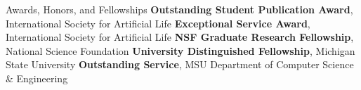 \begin{rubric}{Awards, Honors, and Fellowships}
\entry*[2019] \textbf{Outstanding Student Publication Award}, International Society for Artificial Life 
%
\entry*[2019] \textbf{Exceptional Service Award}, International Society for Artificial Life 
%
\entry*[2014 -- 2017] \textbf{NSF Graduate Research Fellowship}, National Science Foundation 
%
\entry*[2013 -- 2018] \textbf{University Distinguished Fellowship}, Michigan State University 
%
\entry*[2017] \textbf{Outstanding Service}, MSU Department of Computer Science \& Engineering 
%

\end{rubric}